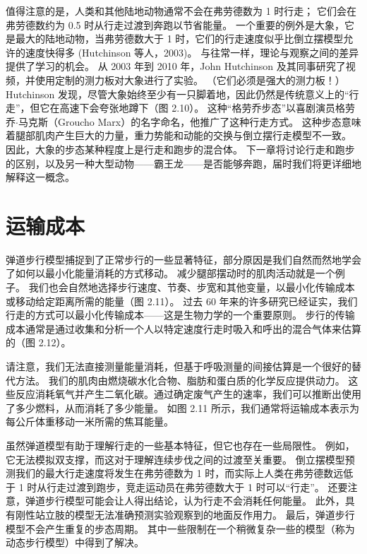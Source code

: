 值得注意的是，人类和其他陆地动物通常不会在弗劳德数为 1 时行走；
它们会在弗劳德数约为 0.5 时从行走过渡到奔跑以节省能量。
一个重要的例外是大象，它是最大的陆地动物，当弗劳德数大于 1 时，它们的行走速度似乎比倒立摆模型允许的速度快得多 (Hutchinson 等人，2003)。
与往常一样，理论与观察之间的差异提供了学习的机会。
从 2003 年到 2010 年，John Hutchinson 及其同事研究了视频，并使用定制的测力板对大象进行了实验。
（它们必须是强大的测力板！）
Hutchinson 发现，尽管大象始终至少有一只脚着地，因此仍然是传统意义上的“行走”，但它在高速下会夸张地蹲下（图 2.10）。
这种“格劳乔步态”以喜剧演员格劳乔$\cdot$马克斯（Groucho Marx）的名字命名，他推广了这种行走方式。
这种步态意味着腿部肌肉产生巨大的力量，重力势能和动能的交换与倒立摆行走模型不一致。
因此，大象的步态某种程度上是行走和跑步的混合体。
下一章将讨论行走和跑步的区别，以及另一种大型动物——霸王龙——是否能够奔跑，届时我们将更详细地解释这一概念。


\section{运输成本}

弹道步行模型捕捉到了正常步行的一些显著特征，部分原因是我们自然而然地学会了如何以最小化能量消耗的方式移动。
减少腿部摆动时的肌肉活动就是一个例子。
我们也会自然地选择步行速度、节奏、步宽和其他变量，以最小化传输成本或移动给定距离所需的能量（图 2.11）。
过去 60 年来的许多研究已经证实，我们行走的方式可以最小化传输成本——这是生物力学的一个重要原则。
步行的传输成本通常是通过收集和分析一个人以特定速度行走时吸入和呼出的混合气体来估算的（图 2.12）。


请注意，我们无法直接测量能量消耗，但基于呼吸测量的间接估算是一个很好的替代方法。
我们的肌肉由燃烧碳水化合物、脂肪和蛋白质的化学反应提供动力。
这些反应消耗氧气并产生二氧化碳。通过确定废气产生的速率，我们可以推断出使用了多少燃料，从而消耗了多少能量。
如图 2.11 所示，我们通常将运输成本表示为每公斤体重移动一米所需的焦耳能量。



虽然弹道模型有助于理解行走的一些基本特征，但它也存在一些局限性。
例如，它无法模拟双支撑，而这对于理解连续步伐之间的过渡至关重要。
倒立摆模型预测我们的最大行走速度将发生在弗劳德数为 1 时，而实际上人类在弗劳德数远低于 1 时从行走过渡到跑步，竞走运动员在弗劳德数大于 1 时可以“行走”。
还要注意，弹道步行模型可能会让人得出结论，认为行走不会消耗任何能量。
此外，具有刚性站立肢的模型无法准确预测实验观察到的地面反作用力。
最后，弹道步行模型不会产生重复的步态周期。
其中一些限制在一个稍微复杂一些的模型（称为动态步行模型）中得到了解决。


